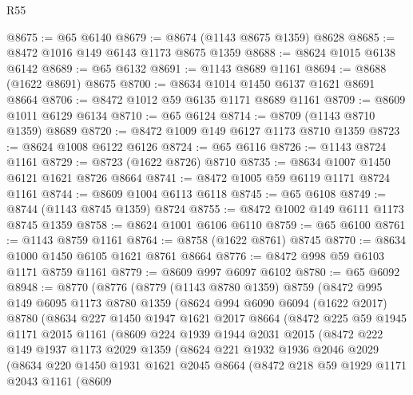 \begin{lexlean}{R55}
\begin{coremodule}
@8675 := @65 @6140
@8679 := @8674 (@1143 @8675 @1359) @8628
@8685 := @8472 @1016 @149 @6143 @1173 @8675 @1359
@8688 := @8624 @1015 @6138 @6142
@8689 := @65 @6132
@8691 := @1143 @8689 @1161
@8694 := @8688 (@1622 @8691) @8675
@8700 := @8634 @1014 @1450 @6137 @1621 @8691 @8664
@8706 := @8472 @1012 @59 @6135 @1171 @8689 @1161
@8709 := @8609 @1011 @6129 @6134
@8710 := @65 @6124
@8714 := @8709 (@1143 @8710 @1359) @8689
@8720 := @8472 @1009 @149 @6127 @1173 @8710 @1359
@8723 := @8624 @1008 @6122 @6126
@8724 := @65 @6116
@8726 := @1143 @8724 @1161
@8729 := @8723 (@1622 @8726) @8710
@8735 := @8634 @1007 @1450 @6121 @1621 @8726 @8664
@8741 := @8472 @1005 @59 @6119 @1171 @8724 @1161
@8744 := @8609 @1004 @6113 @6118
@8745 := @65 @6108
@8749 := @8744 (@1143 @8745 @1359) @8724
@8755 := @8472 @1002 @149 @6111 @1173 @8745 @1359
@8758 := @8624 @1001 @6106 @6110
@8759 := @65 @6100
@8761 := @1143 @8759 @1161
@8764 := @8758 (@1622 @8761) @8745
@8770 := @8634 @1000 @1450 @6105 @1621 @8761 @8664
@8776 := @8472 @998 @59 @6103 @1171 @8759 @1161
@8779 := @8609 @997 @6097 @6102
@8780 := @65 @6092
@8948 := @8770
    (@8776
      (@8779
        (@1143 @8780 @1359)
        @8759
        (@8472
          @995
          @149
          @6095
          @1173
          @8780
          @1359
          (@8624
            @994
            @6090
            @6094
            (@1622 @2017)
            @8780
            (@8634
              @227
              @1450
              @1947
              @1621
              @2017
              @8664
              (@8472
                @225
                @59
                @1945
                @1171
                @2015
                @1161
                (@8609
                  @224
                  @1939
                  @1944
                  @2031
                  @2015
                  (@8472
                    @222
                    @149
                    @1937
                    @1173
                    @2029
                    @1359
                    (@8624
                      @221
                      @1932
                      @1936
                      @2046
                      @2029
                      (@8634
                        @220
                        @1450
                        @1931
                        @1621
                        @2045
                        @8664
                        (@8472
                          @218
                          @59
                          @1929
                          @1171
                          @2043
                          @1161
                          (@8609

\end{coremodule}
\end{lexlean}
